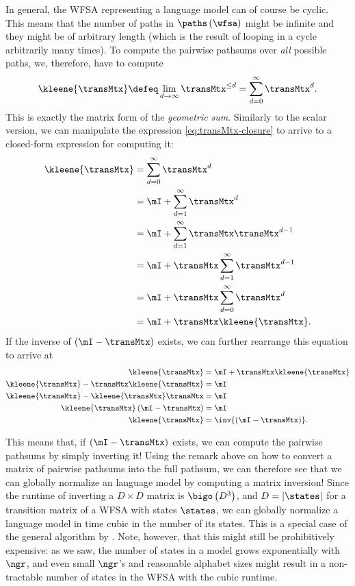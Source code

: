In general, the WFSA representing a \ngram{} language model can of course be cyclic.
This means that the number of paths in $\paths\left(\wfsa\right)$ might be infinite and they might be of arbitrary length (which is the result of looping in a cycle arbitrarily many times).
To compute the pairwise pathsums over \emph{all} possible paths, we, therefore, have to compute
\begin{equation} \label{eq:transMtx-closure}
    \kleene{\transMtx} \defeq \lim_{d \rightarrow \infty} \transMtx^{\leq d} = \sum_{d = 0}^\infty \transMtx^d.
\end{equation}
This is exactly the matrix form of the \emph{geometric sum}.
Similarly to the scalar version, we can manipulate the expression \cref{eq:transMtx-closure} to arrive to a closed-form expression for computing it:
\begin{align}
    \kleene{\transMtx} &= \sum_{d = 0}^\infty \transMtx^d \\
    &= \mI + \sum_{d = 1}^\infty \transMtx^d \\
    &= \mI + \sum_{d = 1}^\infty \transMtx \transMtx^{d - 1} \\
    &= \mI + \transMtx \sum_{d = 1}^\infty \transMtx^{d - 1} \\
    &= \mI + \transMtx \sum_{d = 0}^\infty \transMtx^{d} \\
    &= \mI + \transMtx \kleene{\transMtx}.
\end{align}
If the inverse of $\left(\mI - \transMtx\right)$ exists, we can further rearrange this equation to arrive at
\begin{align}
    \kleene{\transMtx} &= \mI + \transMtx \kleene{\transMtx} \\
    \kleene{\transMtx} - \transMtx \kleene{\transMtx} &= \mI \\
    \kleene{\transMtx} - \kleene{\transMtx} \transMtx &= \mI \\
    \kleene{\transMtx} \left(\mI - \transMtx\right) &= \mI \\
    \kleene{\transMtx} &= \inv{\left(\mI - \transMtx\right)}.
\end{align}

This means that, if $\left(\mI - \transMtx\right)$ exists, we can compute the pairwise pathsums by simply inverting it! 
Using the remark above on how to convert a matrix of pairwise pathsums into the full pathsum, we can therefore see that we can globally normalize an \ngram{} language model by computing a matrix inversion!
Since the runtime of inverting a $D \times D$ matrix is $\bigo\left(D^3\right)$, and $D = |\states|$ for a transition matrix of a WFSA with states $\states$, we can globally normalize a \ngram{} language model in time cubic in the number of its states.
This is a special case of the general algorithm by \citet{lehmann1977algebraic}.
Note, however, that this might still be prohibitively expensive: as we saw, the number of states in a \ngram{} model grows exponentially with $\ngr$, and even small $\ngr$'s and reasonable alphabet sizes might result in a non-tractable number of states in the WFSA with the cubic runtime.

